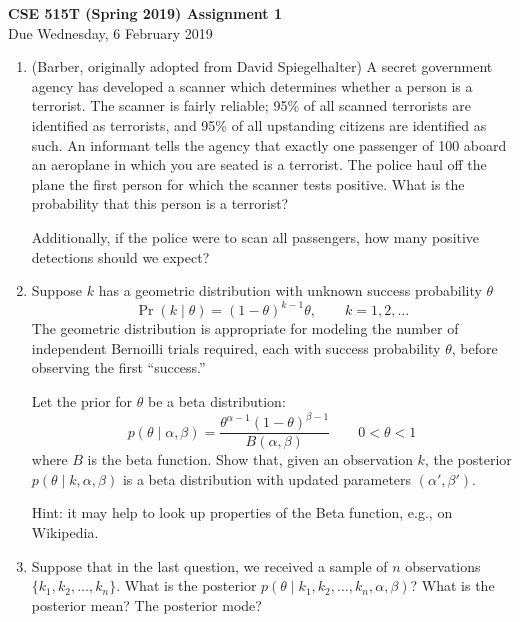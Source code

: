 \documentclass{article}
\newcommand{\given}{\mid}
\begin{document}
{\large \textbf{CSE 515T (Spring 2019) Assignment 1}} \\
Due Wednesday, 6 February 2019 \\

\begin{enumerate}

\item
  (Barber, originally adopted from David Spiegelhalter)
  A secret government agency has developed a scanner which determines
  whether a person is a terrorist. The scanner is fairly reliable;
  95\% of all scanned terrorists are identified as terrorists, and
  95\% of all upstanding citizens are identified as such. An informant
  tells the agency that exactly one passenger of 100 aboard an
  aeroplane in which you are seated is a terrorist. The police haul
  off the plane the first person for which the scanner tests
  positive. What is the probability that this person is a terrorist?

  Additionally, if the police were to scan all passengers, how many
  positive detections should we expect?

\item
  Suppose $k$ has a geometric distribution with unknown success
  probability $\theta$
  \begin{equation*}
    \Pr(k \given \theta) = (1 - \theta)^{k - 1} \theta,
    \qquad
    k = 1, 2, \dotsc
  \end{equation*}
  The geometric distribution is appropriate for modeling the number of
  independent Bernoilli trials required, each with success probability
  $\theta$, before observing the first ``success.''

  Let the prior for $\theta$ be a beta distribution:
  \begin{equation*}
    p(\theta \given \alpha, \beta)
    =
    \frac{\theta^{\alpha - 1} (1 - \theta)^{\beta - 1}}
         {B(\alpha, \beta)}
    \qquad 0 < \theta < 1
  \end{equation*}
  where $B$ is the beta function.  Show that, given an observation
  $k$, the posterior $p(\theta \given k, \alpha, \beta)$ is a beta
  distribution with updated parameters $(\alpha', \beta')$.

  Hint: it may help to look up properties of the Beta function, e.g., on
  Wikipedia.

\item
  Suppose that in the last question, we received a sample of $n$
  observations $\{k_1, k_2, \dotsc, k_n\}$. What is the posterior
  $p(\theta \given k_1, k_2, \dotsc, k_n, \alpha, \beta)$? What is the
  posterior mean? The posterior mode?


\end{enumerate}
\end{document}
